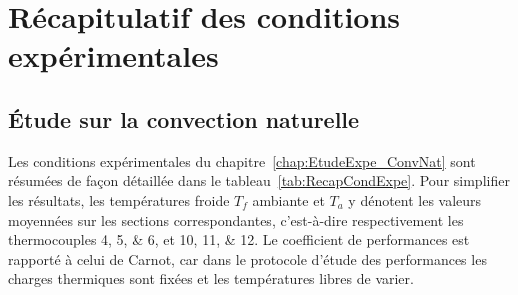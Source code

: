 \chapter{Récapitulatif des conditions expérimentales}
\section{\'Etude sur la convection naturelle}
Les conditions expérimentales du chapitre~\ref{chap:EtudeExpe_ConvNat} sont résumées de façon détaillée dans le tableau~\ref{tab:RecapCondExpe}. Pour simplifier les résultats, les températures froide $T_f$ ambiante et $T_a$ y dénotent les valeurs moyennées sur les sections correspondantes, c'est-à-dire respectivement les thermocouples \numlist{4;5;6}, et \numlist{10;11;12}. Le coefficient de performances est rapporté à celui de Carnot, car dans le protocole d'étude des performances les charges thermiques sont fixées et les températures libres de varier.

